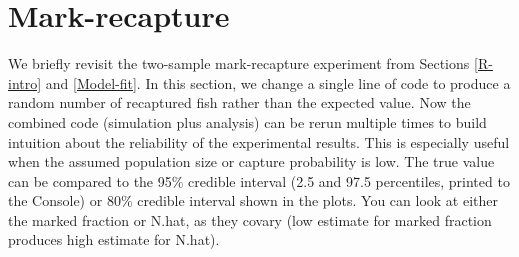 \documentclass[
]{krantz}
\begin{document}
\hypertarget{mark-recapture}{%
\section{Mark-recapture}\label{mark-recapture}}

We briefly revisit the two-sample mark-recapture experiment from Sections \ref{R-intro} and \ref{Model-fit}. In this section, we change a single line of code to produce a random number of recaptured fish rather than the expected value. Now the combined code (simulation plus analysis) can be rerun multiple times to build intuition about the reliability of the experimental results. This is especially useful when the assumed population size or capture probability is low. The true value can be compared to the 95\% credible interval (2.5 and 97.5 percentiles, printed to the Console) or 80\% credible interval shown in the plots. You can look at either the marked fraction or N.hat, as they covary (low estimate for marked fraction produces high estimate for N.hat).
\end{document}
